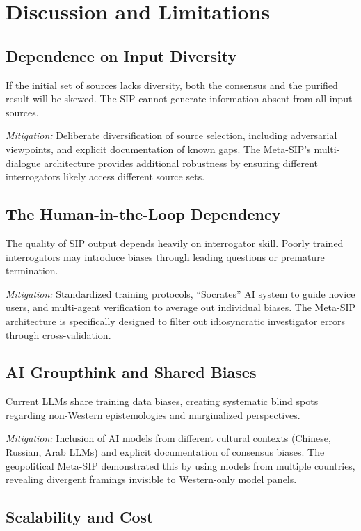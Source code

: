 \documentclass[11pt,a4paper]{article}
\begin{document}
\section{Discussion and Limitations}

\subsection{Dependence on Input Diversity}

If the initial set of sources lacks diversity, both the consensus and the purified result will be skewed. The SIP cannot generate information absent from all input sources.

\textit{Mitigation:} Deliberate diversification of source selection, including adversarial viewpoints, and explicit documentation of known gaps. The Meta-SIP's multi-dialogue architecture provides additional robustness by ensuring different interrogators likely access different source sets.

\subsection{The Human-in-the-Loop Dependency}

The quality of SIP output depends heavily on interrogator skill. Poorly trained interrogators may introduce biases through leading questions or premature termination.

\textit{Mitigation:} Standardized training protocols, ``Socrates'' AI system to guide novice users, and multi-agent verification to average out individual biases. The Meta-SIP architecture is specifically designed to filter out idiosyncratic investigator errors through cross-validation.

\subsection{AI Groupthink and Shared Biases}

Current LLMs share training data biases, creating systematic blind spots regarding non-Western epistemologies and marginalized perspectives.

\textit{Mitigation:} Inclusion of AI models from different cultural contexts (Chinese, Russian, Arab LLMs) and explicit documentation of consensus biases. The geopolitical Meta-SIP demonstrated this by using models from multiple countries, revealing divergent framings invisible to Western-only model panels.

\subsection{Scalability and Cost}
\end{document}
